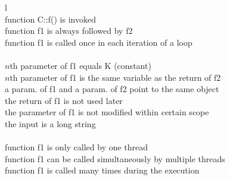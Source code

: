 \begin{table}[h!]
\centering
{
\begin{tabular}{l}
\toprule
{}\\
  \midrule
    function C::f() is invoked	\\
    function f1 is always followed by f2	\\
    function f1 is called once in each iteration of a loop\\
\midrule
{}\\
\midrule
     $n$th parameter of f1 equals K (constant) \\
     $n$th parameter of f1 is the same variable as the return of f2\\
     a param. of f1 and a param. of f2 point to the same object\\
     the return of f1 is not used later	\\
     the parameter of f1 is not modified within certain scope\\
     the input is a long string \\
\midrule
{}\\
\midrule
     function f1 is only called by one thread \\
     function f1 can be called simultaneously by multiple threads \\
     function f1 is called many times during the execution \\
\bottomrule
\end{tabular}
}
\caption{Typical conditions in function rules}
\label{tab:rule}
\end{table}
